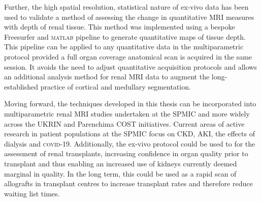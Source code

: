 Further, the high spatial resolution, statistical nature of ex-vivo data has been used to validate a method of assessing the change in quantitative \ac{MRI} measures with depth of renal tissue. This method was implemented using a bespoke Freesurfer and \textsc{matlab} pipeline to generate quantitative maps of tissue depth. This pipeline can be applied to any quantitative data in the multiparametric protocol provided a full organ coverage anatomical scan is acquired in the same session. It avoids the need to adjust quantitative acquisition protocols and allows an additional analysis method for renal \ac{MRI} data to augment the long-established practice of cortical and medullary segmentation.

Moving forward, the techniques developed in this thesis can be incorporated into multiparametric renal \ac{MRI} studies undertaken at the \ac{SPMIC} and more widely across the \ac{UKRIN} and Parenchima \ac{COST} initiatives. Current areas of active research in patient populations at the \ac{SPMIC} focus on \acl{CKD}, \ac{AKI}, the effects of dialysis and \textsc{covid}-19. Additionally, the ex-vivo protocol could be used to for the assessment of renal transplants, increasing confidence in organ quality prior to transplant and thus enabling an increased use of kidneys currently deemed marginal in quality. In the long term, this could be used as a rapid scan of allografts in transplant centres to increase transplant rates and therefore reduce waiting list times. 